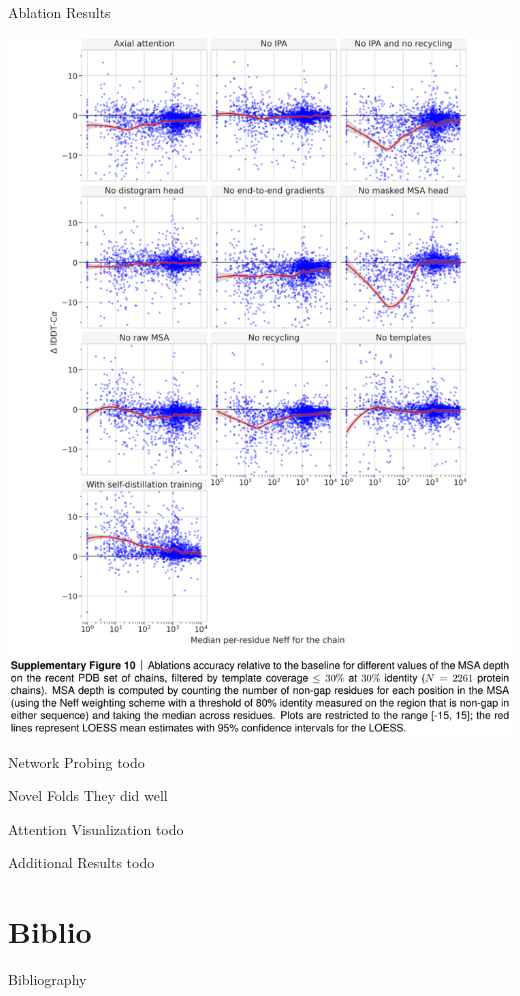 \documentclass[presentation, smaller]{beamer}
\begin{document}
\begin{frame}[label={sec:orgec8d846}]{Ablation Results \cite{jumperHighlyAccurateProtein2021}}
\begin{center}
\includegraphics[height=0.9\textheight]{./imgs/fig10_ablation_results.png}
\end{center}
\end{frame}

\begin{frame}[label={sec:org86e5026}]{Network Probing \cite{jumperHighlyAccurateProtein2021}}
todo
\end{frame}

\begin{frame}[label={sec:org4f1d4fc}]{Novel Folds}
They did well
\end{frame}

\begin{frame}[label={sec:orgaa3cb85}]{Attention Visualization \cite{jumperHighlyAccurateProtein2021}}
todo
\end{frame}

\begin{frame}[label={sec:org90e4014}]{Additional Results \cite{jumperHighlyAccurateProtein2021}}
todo
\end{frame}

\section*{Biblio}
\label{sec:org3e23c2b}
\begin{frame}[fragile,allowframebreaks,label=]{Bibliography}
\printbibliography
\end{frame}
\end{document}
